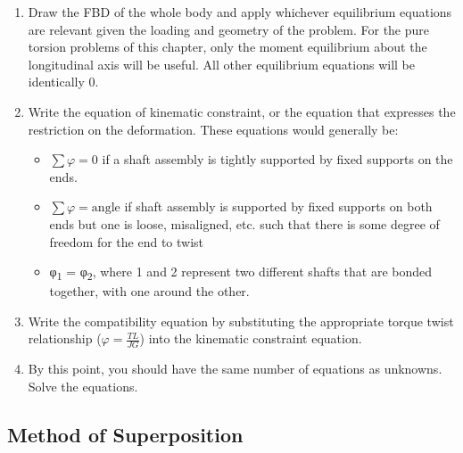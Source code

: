 \documentclass[
  letterpaper,
  DIV=11,
  numbers=noendperiod]{scrreprt}
\providecommand{\tightlist}{%
  \setlength{\itemsep}{0pt}\setlength{\parskip}{0pt}}\usepackage{longtable,booktabs,array}
\begin{document}
\begin{tcolorbox}[enhanced jigsaw, breakable, opacityback=0, toptitle=1mm, left=2mm, colback=white, opacitybacktitle=0.6, colframe=quarto-callout-note-color-frame, titlerule=0mm, arc=.35mm, leftrule=.75mm, bottomtitle=1mm, colbacktitle=quarto-callout-note-color!10!white, rightrule=.15mm, title={Step-by-step: Statically Indeterminate Structures}, bottomrule=.15mm, toprule=.15mm, coltitle=black]

\begin{enumerate}
\def\labelenumi{\arabic{enumi}.}
\tightlist
\item
  Draw the FBD of the whole body and apply whichever equilibrium
  equations are relevant given the loading and geometry of the problem.
  For the pure torsion problems of this chapter, only the moment
  equilibrium about the longitudinal axis will be useful. All other
  equilibrium equations will be identically 0.
\item
  Write the equation of kinematic constraint, or the equation that
  expresses the restriction on the deformation. These equations would
  generally be:

  \begin{itemize}
  \item
    \(\sum \varphi=0\) if a shaft assembly is tightly supported by fixed
    supports on the ends.
  \item
    \(\sum \varphi=\text{angle}\) if shaft assembly is supported by
    fixed supports on both ends but one is loose, misaligned, etc. such
    that there is some degree of freedom for the end to twist
  \item
    φ\textsubscript{1} = φ\textsubscript{2}, where 1 and 2 represent two
    different shafts that are bonded together, with one around the
    other.
  \end{itemize}
\item
  Write the compatibility equation by substituting the appropriate
  torque twist relationship (\(\varphi=\frac{T L}{J G}\)) into the
  kinematic constraint equation.
\item
  By this point, you should have the same number of equations as
  unknowns. Solve the equations.
\end{enumerate}

\end{tcolorbox}

\subsection{Method of Superposition}\label{method-of-superposition}
\end{document}
